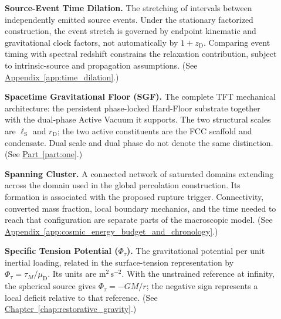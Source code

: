 \begin{description}
\item[] \begin{minipage}[t]{\linewidth}
\textbf{Source-Event Time Dilation.} The stretching of intervals between independently emitted source events. Under the stationary factorized construction, the event stretch is governed by endpoint kinematic and gravitational clock factors, not automatically by $1+z_{\mathrm D}$. Comparing event timing with spectral redshift constrains the relaxation contribution, subject to intrinsic-source and propagation assumptions.
(See \hyperref[app:time_dilation]{Appendix~\ref*{app:time_dilation}}.)
\end{minipage}

\item[] \begin{minipage}[t]{\linewidth}
\textbf{Spacetime Gravitational Floor (SGF).} The complete TFT mechanical architecture: the persistent phase-locked Hard-Floor substrate together with the dual-phase Active Vacuum it supports. The two structural scales are $\ell_{\mathrm S}$ and $r_{\mathrm D}$; the two active constituents are the FCC scaffold and condensate. Dual scale and dual phase do not denote the same distinction.
(See \hyperref[part:one]{Part~\ref*{part:one}}.)
\end{minipage}

\item[] \begin{minipage}[t]{\linewidth}
\textbf{Spanning Cluster.} A connected network of saturated domains extending across the domain used in the global percolation construction. Its formation is associated with the proposed rupture trigger. Connectivity, converted mass fraction, local boundary mechanics, and the time needed to reach that configuration are separate parts of the macroscopic model.
(See \hyperref[app:cosmic_energy_budget_and_chronology]{Appendix~\ref*{app:cosmic_energy_budget_and_chronology}}.)
\end{minipage}

\item[] \begin{minipage}[t]{\linewidth}
\textbf{Specific Tension Potential ($\Phi_\tau$).} The gravitational potential per unit inertial loading, related in the surface-tension representation by $\Phi_\tau=\tau_M/\mu_{\mathrm D}$. Its units are $\mathrm{m^2\,s^{-2}}$. With the unstrained reference at infinity, the spherical source gives $\Phi_\tau=-GM/r$; the negative sign represents a local deficit relative to that reference.
(See \hyperref[chap:restorative_gravity]{Chapter~\ref*{chap:restorative_gravity}}.)
\end{minipage}


\end{description}
